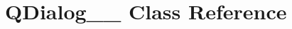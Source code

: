 \hypertarget{classGUI_1_1Player_1_1QDialog____12}{}\section{Q\+Dialog\+\_\+\+\_ Class Reference}
\label{classGUI_1_1Player_1_1QDialog____12}
